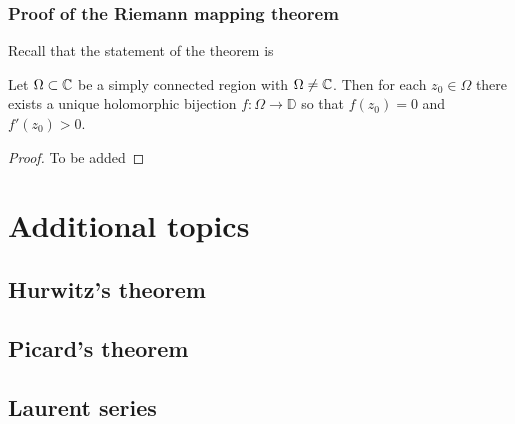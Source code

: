 \documentclass[11pt,a4paper]{article}
\begin{document}
\subsubsection{Proof of the Riemann mapping theorem}
\begin{remark}
Recall that the statement of the theorem is
\end{remark}
\begin{theorem}
  Let $\Omega \subset \mathbb{C}$ be a simply connected region with $\Omega \neq \mathbb{C}$.
  Then for each $z_0 \in \Omega$ there exists a unique holomorphic bijection
  $f \colon \Omega \to \mathbb D$ so that $f(z_0) = 0$ and $f'(z_0) > 0$.
\end{theorem}
\begin{proof}
  To be added
\end{proof}

\section{Additional topics}
\subsection{Hurwitz's theorem}
\subsection{Picard's theorem}
\subsection{Laurent series}
\end{document}
